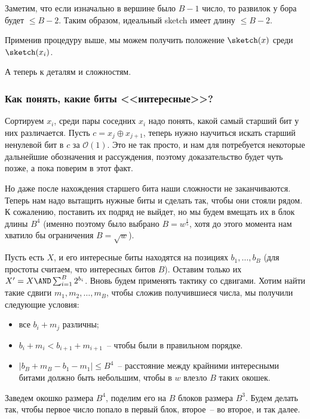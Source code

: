Заметим, что если изначально в вершине было $B-1$ число, то развилок у бора будет $\leqslant B-2$. Таким образом, идеальный sketch имеет длину $\leqslant B-2$.

Применив процедуру выше, мы можем получить положение $\sketch(x)$ среди $\sketch(x_i)$. 

\smallskip

А теперь к деталям и сложностям.

\subsubsection{Как понять, какие биты <<интересные>>?}

Сортируем $x_i$, среди пары соседних $x_i$ надо понять, какой самый старший бит у них различается. Пусть $c = x_j \oplus x_{j+1}$, теперь нужно научиться искать старший ненулевой бит в $c$ за $\mathcal{O}(1)$. Это не так просто, и нам для потребуется некоторые дальнейшие обозначения и рассуждения, поэтому доказательство будет чуть позже, а пока поверим в этот факт.

\bigskip

Но даже после нахождения старшего бита наши сложности не заканчиваются. Теперь нам надо вытащить нужные биты и сделать так, чтобы они стояли рядом. К сожалению, поставить их подряд не выйдет, но мы будем вмещать их в блок длины $B^4$ (именно поэтому было выбрано $B = w^{\frac{1}{5}}$, хотя до этого момента нам хватило бы ограничения $B = \sqrt{w}$). 

Пусть есть $X$, и его интересные биты находятся на позициях $b_1, \ldots, b_B$ (для простоты считаем, что интересных битов $B$). Оставим только их $X' = X \AND \sum_{i=1}^{B} 2^{b_i}$. Вновь будем применять тактику со сдвигами. Хотим найти такие сдвиги $m_1, m_2, \ldots, m_B$, чтобы сложив получившиеся числа, мы получили следующие условия:

\begin{itemize}
    \item все $b_i+m_j$ различны;
    \item $b_i + m_i < b_{i+1} + m_{i+1}$~-- чтобы были в правильном порядке.
    \item $|b_B + m_B - b_1 - m_1| \leqslant B^4$~-- расстояние между крайними интересными битами должно быть небольшим, чтобы в $w$ влезло $B$ таких окошек.
\end{itemize}

Заведем окошко размера $B^4$, поделим его на $B$ блоков размера $B^3$. Будем делать так, чтобы первое число попало в первый блок, второе~-- во второе, и так далее.


